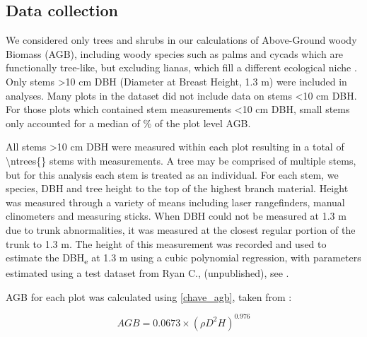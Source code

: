 \documentclass[11pt,a4paper]{article}
\begin{document}

\subsection{Data collection}
 
We considered only trees and shrubs in our calculations of Above-Ground woody Biomass (AGB), including woody species such as palms and cycads which are functionally tree-like, but excluding lianas, which fill a different ecological niche \citep{Selaya2008}. Only stems >10 cm DBH (Diameter at Breast Height, 1.3 m) were included in analyses. Many plots in the dataset did not include data on stems <10 cm DBH. For those plots which contained stem measurements <10 cm DBH, small stems only accounted for a median of \percsmallagb{}\% of the plot level AGB. 

All stems >10 cm DBH were measured within each plot resulting in a total of \num[group-separator={,}]{\ntrees{}} stems with measurements. A tree may be comprised of multiple stems, but for this analysis each stem is treated as an individual. For each stem, we  species, DBH and tree height to the top of the highest branch material. Height was measured through a variety of means including laser rangefinders, manual clinometers and measuring sticks. When DBH could not be measured at 1.3 m due to trunk abnormalities, it was measured at the closest regular portion of the trunk to 1.3 m. The height of this measurement was recorded and used to estimate the DBH\textsubscript{e} at 1.3 m using a cubic polynomial regression, with parameters estimated using a test dataset from Ryan C., (unpublished), see  \citet{Godlee2020}.

AGB for each plot was calculated using \autoref{chave_agb}, taken from \citet{Chave2014}:

\begin{equation}
	AGB = 0.0673 \times (\rho D^{2} H)^{0.976}
	\label{chave_agb}
\end{equation}
\end{document}
